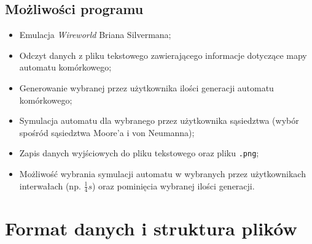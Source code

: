 \documentclass[a4paper,12pt]{article}
\begin{document}
\subsection{Możliwości programu}
\begin{itemize}
\item Emulacja \textit{Wireworld} Briana Silvermana;
\item Odczyt danych z pliku tekstowego zawierającego informacje dotyczące mapy automatu komórkowego;
\item Generowanie wybranej przez użytkownika ilości generacji automatu komórkowego;
\item Symulacja automatu dla wybranego przez użytkownika sąsiedztwa (wybór spośród sąsiedztwa Moore'a i von Neumanna);
\item Zapis danych wyjściowych do pliku tekstowego oraz pliku \texttt{.png};
\item Możliwość wybrania symulacji automatu w wybranych przez użytkownikach interwałach (np. $\frac{1}{4}s$) oraz pominięcia wybranej ilości generacji.
\end{itemize}

\section{Format danych i struktura plików}
\end{document}
